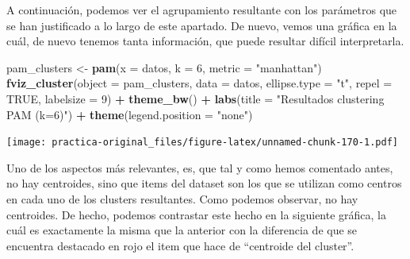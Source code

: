 \documentclass[spanish,]{article}
\newenvironment{Shaded}{\begin{snugshade}}{\end{snugshade}}
\newcommand{\KeywordTok}[1]{\textcolor[rgb]{0.13,0.29,0.53}{\textbf{#1}}}
\newcommand{\DataTypeTok}[1]{\textcolor[rgb]{0.13,0.29,0.53}{#1}}
\newcommand{\DecValTok}[1]{\textcolor[rgb]{0.00,0.00,0.81}{#1}}
\newcommand{\StringTok}[1]{\textcolor[rgb]{0.31,0.60,0.02}{#1}}
\newcommand{\OtherTok}[1]{\textcolor[rgb]{0.56,0.35,0.01}{#1}}
\newcommand{\OperatorTok}[1]{\textcolor[rgb]{0.81,0.36,0.00}{\textbf{#1}}}
\newcommand{\NormalTok}[1]{#1}
\begin{document}
A continuación, podemos ver el agrupamiento resultante con los
parámetros que se han justificado a lo largo de este apartado. De nuevo,
vemos una gráfica en la cuál, de nuevo tenemos tanta información, que
puede resultar difícil interpretarla.

\begin{Shaded}
\begin{Highlighting}[]
\NormalTok{pam_clusters <-}\StringTok{ }\KeywordTok{pam}\NormalTok{(}\DataTypeTok{x =}\NormalTok{ datos, }\DataTypeTok{k =} \DecValTok{6}\NormalTok{, }\DataTypeTok{metric =} \StringTok{"manhattan"}\NormalTok{)}
\KeywordTok{fviz_cluster}\NormalTok{(}\DataTypeTok{object =}\NormalTok{ pam_clusters, }\DataTypeTok{data =}\NormalTok{ datos, }\DataTypeTok{ellipse.type =} \StringTok{"t"}\NormalTok{, }\DataTypeTok{repel =} \OtherTok{TRUE}\NormalTok{,}
             \DataTypeTok{labelsize =} \DecValTok{9}\NormalTok{) }\OperatorTok{+}
\StringTok{  }\KeywordTok{theme_bw}\NormalTok{() }\OperatorTok{+}
\StringTok{  }\KeywordTok{labs}\NormalTok{(}\DataTypeTok{title =} \StringTok{"Resultados clustering PAM (k=6)"}\NormalTok{) }\OperatorTok{+}
\StringTok{  }\KeywordTok{theme}\NormalTok{(}\DataTypeTok{legend.position =} \StringTok{"none"}\NormalTok{)}
\end{Highlighting}
\end{Shaded}

\texttt{[image: practica-original\_files/figure-latex/unnamed-chunk-170-1.pdf]}

Uno de los aspectos más relevantes, es, que tal y como hemos comentado
antes, no hay centroides, sino que items del dataset son los que se
utilizan como centros en cada uno de los clusters resultantes. Como
podemos observar, no hay centroides. De hecho, podemos contrastar este
hecho en la siguiente gráfica, la cuál es exactamente la misma que la
anterior con la diferencia de que se encuentra destacado en rojo el item
que hace de ``centroide del cluster''.
\end{document}
